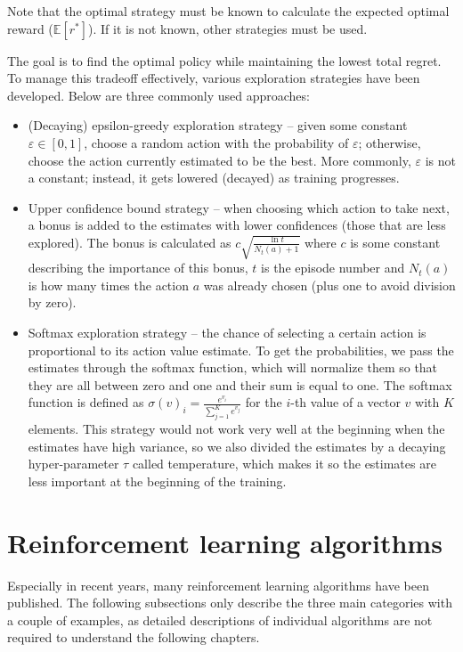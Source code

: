 \documentclass[
  digital,     %
  oneside,     %
  nosansbold,  %
  nocolorbold, %
  lof,         %
  lot,         %
]{fithesis4}
\begin{document}
Note that the optimal strategy must be known to calculate the expected optimal reward ($\mathbb{E}[r^*]$). If it is not known, other strategies must be used.

The goal is to find the optimal policy while maintaining the lowest total regret. To manage this tradeoff effectively, various exploration strategies have been developed. Below are three commonly used approaches:

\begin{itemize}
    \item (Decaying) epsilon-greedy exploration strategy -- given some constant $\varepsilon \in [0,1]$, choose a random action with the probability of $\varepsilon$; otherwise, choose the action currently estimated to be the best. More commonly, $\varepsilon$ is not a constant; instead, it gets lowered (decayed) as training progresses.
    \item Upper confidence bound strategy -- when choosing which action to take next, a bonus is added to the estimates with lower confidences (those that are less explored). The bonus is calculated as $c\sqrt{\frac{\ln{t}}{N_t(a)+1}}$ where $c$ is some constant describing the importance of this bonus, $t$ is the episode number and $N_t(a)$ is how many times the action $a$ was already chosen (plus one to avoid division by zero).
    \item Softmax exploration strategy -- the chance of selecting a certain action is proportional to its action value estimate. To get the probabilities, we pass the estimates through the softmax function, which will normalize them so that they are all between zero and one and their sum is equal to one. The softmax function is defined as $\sigma (v)_i = \frac{e^{v_i}}{\sum^{K}_{j=1}e^{v_j}}$ for the $i$-th value of a vector $v$ with $K$ elements. This strategy would not work very well at the beginning when the estimates have high variance, so we also divided the estimates by a decaying hyper-parameter $\tau$ called temperature, which makes it so the estimates are less important at the beginning of the training.
\end{itemize}



\section{Reinforcement learning algorithms}
\label{sec:algos}

Especially in recent years, many reinforcement learning algorithms have been published. The following subsections only describe the three main categories with a couple of examples, as detailed descriptions of individual algorithms are not required to understand the following chapters.
\end{document}
